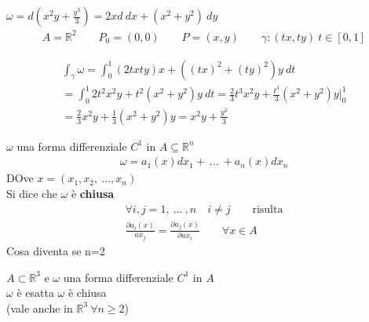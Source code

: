 \documentclass[a4paper, oneside]{article}
\begin{document}
\begin{example}
    $\omega = d(x^2y+\frac{y^3}{3}) = 2xd \ dx + (x^2+y^2) \ dy$
    \begin{gather*}
        A = \mathbb{R}^2 \qquad P_0 = (0,0) \qquad P=(x,y) \qquad \gamma:(tx,ty) \ t \in [0,1]
    \end{gather*}
    \begin{center}
    \end{center}
    \begin{gather*}
        \int_{\gamma} \omega = \int_{0}^{1} (2txty) x +  ((tx)^2 +(ty)^2)y \ dt\\
        = \int_{0}^{1} 2t^2 x^2y + t^2 (x^2+y^2)y \ dt = \frac{2}{3}t^3x^2y + \frac{t^3}{3}(x^2+y^2)y|_0^1\\
        = \frac{2}{3}x^2y + \frac{1}{3}(x^2+y^2)y = x^2y + \frac{y^3}{3}
    \end{gather*}
\end{example}
\begin{proposition}
     $\omega$ una forma differenziale $C^1$ in $A \subseteq \mathbb{R}^n$
    \begin{gather*}
        \omega = a_1(x) dx_1 + \ ... \ + a_n(x) dx_n
    \end{gather*}
    DOve $x= (x_1,x_2, \ ... , x_n)$\\
    Si dice che $\omega$ è \textbf{chiusa} 
    \begin{gather*}
        \forall i,j = 1, \ ... \ ,n \quad i \neq j \qquad \text{risulta}\\
        \frac{\partial a_i(x)}{ax_j} = \frac{\partial a_j(x)}{\partial ax_i} \qquad \forall x \in A
    \end{gather*}
    Cosa diventa se n=2\\
    
\end{proposition}
\begin{theorem}
     $A \subset \mathbb{R}^3$ e $\omega$ una forma differenziale $C^1$ in $A$ \\
     $\omega$ è esatta  $\omega$ è chiusa\\
    (vale anche in $\mathbb{R}^3 \ \forall n \geq 2$)
\end{theorem}
\end{document}
